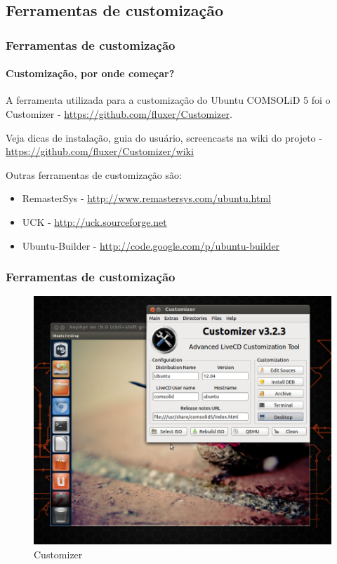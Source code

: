 \subsection{Ferramentas de customização}

\begin{frame}


\end{frame}

\begin{frame}\frametitle{Ferramentas de customização}\framesubtitle{Customização, por onde começar?}

A ferramenta utilizada para a customização do Ubuntu COMSOLiD 5 foi o Customizer -
\url{https://github.com/fluxer/Customizer}.

\medskip

Veja dicas de instalação, guia do usuário, screencasts na wiki do projeto -
\url{https://github.com/fluxer/Customizer/wiki}

\medskip

Outras ferramentas de customização são:

\begin{itemize}
	\item RemasterSys - \url{http://www.remastersys.com/ubuntu.html}
	\item UCK - \url{http://uck.sourceforge.net}
	\item Ubuntu-Builder - \url{http://code.google.com/p/ubuntu-builder}
\end{itemize}

\end{frame}

\begin{frame}\frametitle{Ferramentas de customização}

\begin{figure}
	\includegraphics[scale=0.25]{img/customizer.png}
	\caption{Customizer}
\end{figure}

\end{frame}


